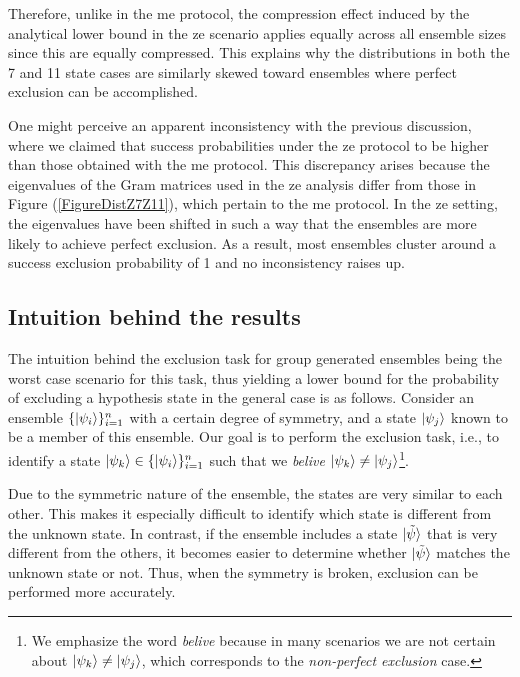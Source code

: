 \documentclass[12pt,letterpaper]{article}
\begin{document}
Therefore, unlike in the \gls{me} protocol, the compression effect induced by the analytical lower bound in the \gls{ze} scenario applies equally across all ensemble sizes since this are equally compressed. This explains why the distributions in both the 7 and 11 state cases are similarly skewed toward ensembles where perfect exclusion can be accomplished. 

One might perceive an apparent inconsistency with the previous discussion, where we claimed that success probabilities under the \gls{ze} protocol to be higher than those obtained with the \gls{me} protocol. This discrepancy arises because the eigenvalues of the Gram matrices used in the \gls{ze} analysis differ from those in Figure (\ref{FigureDistZ7Z11}), which pertain to the \gls{me} protocol. In the \gls{ze} setting, the eigenvalues have been shifted in such a way that the ensembles are more likely to achieve perfect exclusion. As a result, most ensembles cluster around a success exclusion probability of 1 and no inconsistency raises up.

\subsection{Intuition behind the results}

\hspace{20pt}The intuition behind the exclusion task for group generated ensembles being the worst case scenario for this task, thus yielding a lower bound for the probability of excluding a hypothesis state in the general case is as follows. Consider an ensemble $\{\ket{\psi_i}\}_{i=1}^n$ with a certain degree of symmetry, and a state $\ket{\psi_j}$ known to be a member of this ensemble. Our goal is to perform the exclusion task, i.e., to identify a state $\ket{\psi_k} \in \{\ket{\psi_i}\}_{i=1}^n$ such that we \emph{belive} $\ket{\psi_k} \neq \ket{\psi_j}$\footnote{We emphasize the word \emph{belive} because in many scenarios we are not certain about $\ket{\psi_k} \neq \ket{\psi_j}$, which corresponds to the \emph{non-perfect exclusion} case.}.

Due to the symmetric nature of the ensemble, the states are very similar to each other. This makes it especially difficult to identify which state is different from the unknown state. In contrast, if the ensemble includes a state $\ket{\tilde{\psi}}$ that is very different from the others, it becomes easier to determine whether $\ket{\tilde{\psi}}$ matches the unknown state or not. Thus, when the symmetry is broken, exclusion can be performed more accurately.
\end{document}
